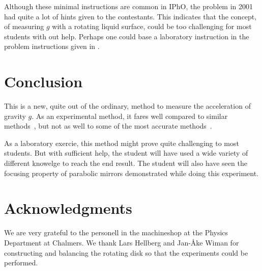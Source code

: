 \documentclass[11pt,
a4paper, 
swedish, english]{article}
\begin{document}
Although these minimal instructions are common in IPhO, the problem in
2001~\cite{IPhO2001} had quite a lot of hints given to the
contestants. This indicates that the concept, of measuring $g$ with a
rotating liquid surface, could be too challenging for most students
with out help. Perhaps one could base a laboratory instruction in the
problem instructions given in \cite{IPhO2001}. 



\section{Conclusion}
This is a new, quite out of the ordinary, method to measure the
acceleration of gravity $g$. As an experimental method, it fares well
compared to similar methods~\cite{IPhO2001}, but not as well to some
of the most accurate methods~\cite{Candela2001}. 

As a laboratory exercie, this method might prove quite challenging to
most students. But with sufficient help, the student will have used a
wide variety of different knowelge to reach the end result. The
student will also have seen the focusing property of parabolic mirrors
demonstrated while doing this experiment.




\section*{Acknowledgments}
We are very grateful to the personell in the machineshop at the
Physics Department at Chalmers. We thank Lars Hellberg and Jan-Åke
Wiman for constructing and balancing the rotating disk so that the
experiments could be performed. 





\end{document}
